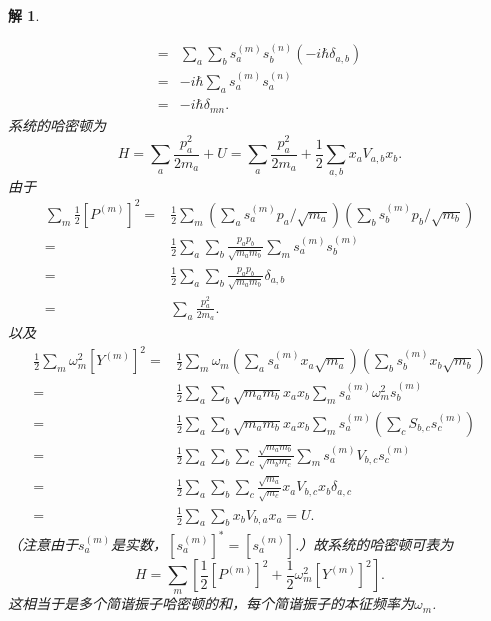 \documentclass[UTF8,10pt,a4paper]{article}
\theoremstyle{Problem}
\theoremstyle{Solution}
\newtheorem*{sol}{解}
\begin{document}
\begin{sol}
\begin{enumerate}
\begin{align}
            \nonumber=&\sum_a\sum_bs_a^{(m)}s_b^{(n)}(-i\hbar\delta_{a,b})\\
            \nonumber=&-i\hbar\sum_as_a^{(m)}s_a^{(n)}\\
            =&-i\hbar\delta_{mn}.
        \end{align}
        系统的哈密顿为
        \begin{equation}
            H=\sum_a\frac{p_a^2}{2m_a}+U=\sum_a\frac{p_a^2}{2m_a}+\frac{1}{2}\sum_{a,b}x_aV_{a,b}x_b.
        \end{equation}
        由于
        \begin{align}
            \nonumber\sum_m\frac{1}{2}[P^{(m)}]^2=&\frac{1}{2}\sum_m\left(\sum_as_a^{(m)}p_a/\sqrt{m_a}\right)\left(\sum_bs_b^{(m)}p_b/\sqrt{m_b}\right)\\
            \nonumber=&\frac{1}{2}\sum_a\sum_b\frac{p_ap_b}{\sqrt{m_am_b}}\sum_ms_a^{(m)}s_b^{(m)}\\
            \nonumber=&\frac{1}{2}\sum_a\sum_b\frac{p_ap_b}{\sqrt{m_am_b}}\delta_{a,b}\\
            =&\sum_a\frac{p_a^2}{2m_a}.
        \end{align}
        以及
        \begin{align}
            \nonumber\frac{1}{2}\sum_m\omega_m^2[Y^{(m)}]^2=&\frac{1}{2}\sum_m\omega_m\left(\sum_as_a^{(m)}x_a\sqrt{m_a}\right)\left(\sum_bs_b^{(m)}x_b\sqrt{m_b}\right)\\
            \nonumber=&\frac{1}{2}\sum_a\sum_b\sqrt{m_am_b}x_ax_b\sum_ms_a^{(m)}\omega_m^2s_b^{(m)}\\
            \nonumber=&\frac{1}{2}\sum_a\sum_b\sqrt{m_am_b}x_ax_b\sum_ms_a^{(m)}\left(\sum_cS_{b,c}s_c^{(m)}\right)\\
            \nonumber=&\frac{1}{2}\sum_a\sum_b\sum_c\frac{\sqrt{m_am_b}}{\sqrt{m_bm_c}}\sum_ms_a^{(m)}V_{b,c}s_c^{(m)}\\
            \nonumber=&\frac{1}{2}\sum_a\sum_b\sum_c\frac{\sqrt{m_a}}{\sqrt{m_c}}x_aV_{b,c}x_b\delta_{a,c}\\
            \nonumber=&\frac{1}{2}\sum_a\sum_bx_bV_{b,a}x_a=U.
        \end{align}
        （注意由于$s_a^{(m)}$是实数，$[s_a^{(m)}]^*=[s_a^{(m)}]$.）故系统的哈密顿可表为
        \begin{equation}
            H=\sum_m\left[\frac{1}{2}[P^{(m)}]^2+\frac{1}{2}\omega_m^2[Y^{(m)}]^2\right].
        \end{equation}
        这相当于是多个简谐振子哈密顿的和，每个简谐振子的本征频率为$\omega_m$.
    \end{enumerate}
\end{sol}
\end{document}
